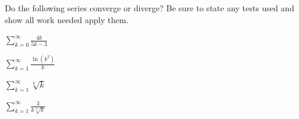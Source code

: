 \documentclass{exam}[12pt]
\begin{document}
\pagestyle{head}

\extraheadheight{.3in}
\extrafootheight{-.3in} 


\vspace{.2in}
\large{

Do the following series converge or diverge? Be sure to state any
tests used and show all work needed apply them.

\begin{questions}

\question $\displaystyle
\sum_{k=0}^\infty \frac{4k}{5k-3} $ 
\vspace{2in}

\question $\displaystyle
\sum_{k=1}^\infty \frac{\ln(k^2)}{k} $ 
\vspace{2in}

\question $\displaystyle
\sum_{k=1}^\infty \sqrt[k]{ k} $ 
\vspace{2in}

\question $\displaystyle
\sum_{k=1}^\infty \frac{3}{k\sqrt[3] k} $ 
\vspace{2in}



\end{questions}

}
\end{document}
